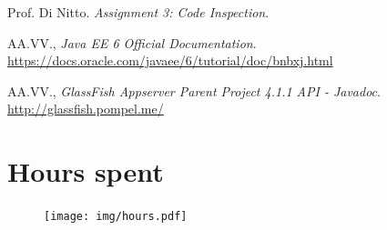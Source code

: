 \documentclass[a4paper, 11pt]{article}
\begin{document}
\appendix

\clearpage
{}

\begin{thebibliography}{9}
 Prof. Di Nitto.
\emph{Assignment 3: Code Inspection}.

 AA.VV.,
\emph{Java EE 6 Official Documentation}.
\url{https://docs.oracle.com/javaee/6/tutorial/doc/bnbxj.html}

 AA.VV.,
\emph{GlassFish Appserver Parent Project 4.1.1 API - Javadoc}.
\url{http://glassfish.pompel.me/}
\end{thebibliography}

\vfill

\section*{Hours spent}
\begin{figure}[htb]
    \centering
    \texttt{[image: img/hours.pdf]}
    \label{fig:hours}
\end{figure}
\end{document}

